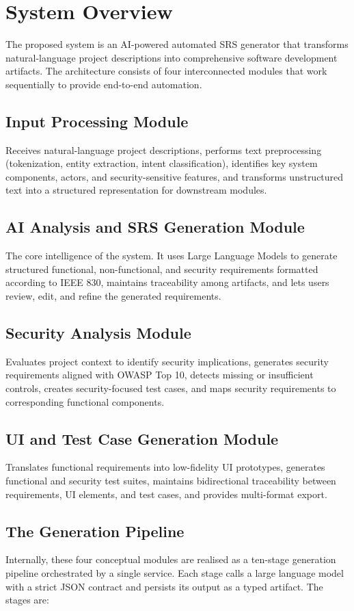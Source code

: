 \documentclass[12pt,a4paper,oneside]{report}
\begin{document}
\section{System Overview}
The proposed system is an AI-powered automated SRS generator that transforms natural-language project descriptions into comprehensive software development artifacts. The architecture consists of four interconnected modules that work sequentially to provide end-to-end automation.

\subsection{Input Processing Module}
Receives natural-language project descriptions, performs text preprocessing (tokenization, entity extraction, intent classification), identifies key system components, actors, and security-sensitive features, and transforms unstructured text into a structured representation for downstream modules.

\subsection{AI Analysis and SRS Generation Module}
The core intelligence of the system. It uses Large Language Models to generate structured functional, non-functional, and security requirements formatted according to IEEE 830, maintains traceability among artifacts, and lets users review, edit, and refine the generated requirements.

\subsection{Security Analysis Module}
Evaluates project context to identify security implications, generates security requirements aligned with OWASP Top 10, detects missing or insufficient controls, creates security-focused test cases, and maps security requirements to corresponding functional components.

\subsection{UI and Test Case Generation Module}
Translates functional requirements into low-fidelity UI prototypes, generates functional and security test suites, maintains bidirectional traceability between requirements, UI elements, and test cases, and provides multi-format export.

\subsection{The Generation Pipeline}
Internally, these four conceptual modules are realised as a ten-stage generation pipeline orchestrated by a single service. Each stage calls a large language model with a strict JSON contract and persists its output as a typed artifact. The stages are:
\end{document}
